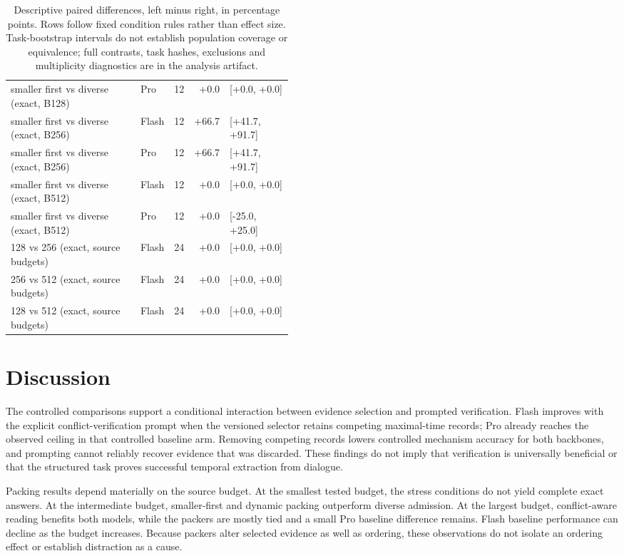 \documentclass{article}
\begin{document}
\begin{table}[ht]
\begin{tabular}{p{0.46\linewidth}lrrl}
smaller first vs diverse (exact, B128) & Pro & 12 & +0.0 & [+0.0, +0.0] \\
smaller first vs diverse (exact, B256) & Flash & 12 & +66.7 & [+41.7, +91.7] \\
smaller first vs diverse (exact, B256) & Pro & 12 & +66.7 & [+41.7, +91.7] \\
smaller first vs diverse (exact, B512) & Flash & 12 & +0.0 & [+0.0, +0.0] \\
smaller first vs diverse (exact, B512) & Pro & 12 & +0.0 & [-25.0, +25.0] \\
128 vs 256 (exact, source budgets) & Flash & 24 & +0.0 & [+0.0, +0.0] \\
256 vs 512 (exact, source budgets) & Flash & 24 & +0.0 & [+0.0, +0.0] \\
128 vs 512 (exact, source budgets) & Flash & 24 & +0.0 & [+0.0, +0.0] \\
\bottomrule\end{tabular}\caption{Descriptive paired differences, left minus right, in percentage points. Rows follow fixed condition rules rather than effect size. Task-bootstrap intervals do not establish population coverage or equivalence; full contrasts, task hashes, exclusions and multiplicity diagnostics are in the analysis artifact.}\end{table}
\section{Discussion}
The controlled comparisons support a conditional interaction between evidence selection and prompted verification. Flash improves with the explicit conflict-verification prompt when the versioned selector retains competing maximal-time records; Pro already reaches the observed ceiling in that controlled baseline arm. Removing competing records lowers controlled mechanism accuracy for both backbones, and prompting cannot reliably recover evidence that was discarded. These findings do not imply that verification is universally beneficial or that the structured task proves successful temporal extraction from dialogue.

Packing results depend materially on the source budget. At the smallest tested budget, the stress conditions do not yield complete exact answers. At the intermediate budget, smaller-first and dynamic packing outperform diverse admission. At the largest budget, conflict-aware reading benefits both models, while the packers are mostly tied and a small Pro baseline difference remains. Flash baseline performance can decline as the budget increases. Because packers alter selected evidence as well as ordering, these observations do not isolate an ordering effect or establish distraction as a cause.
\end{document}
